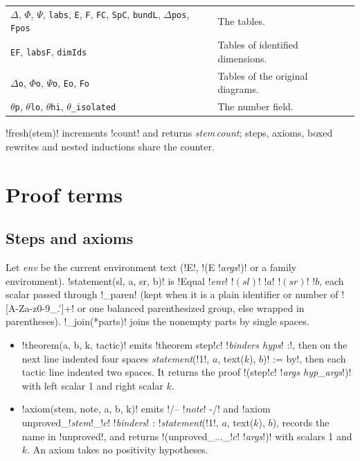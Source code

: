 {\begin{xltabular}{\linewidth}{@{}p{4.1cm}X@{}}
\texttt{$\Delta$}, \texttt{$\Phi$}, \texttt{$\Psi$}, \texttt{labs}, \texttt{E}, \texttt{F}, \texttt{FC}, \texttt{SpC},
  \texttt{bundL}, \texttt{$\Delta$pos}, \texttt{Fpos} & The tables. \\
\texttt{EF}, \texttt{labsF}, \texttt{dimIds} & Tables of identified dimensions. \\
\texttt{$\Delta$o}, \texttt{$\Phi$o}, \texttt{$\Psi$o}, \texttt{Eo}, \texttt{Fo} & Tables of the original diagrams. \\
\texttt{$\theta$p}, \texttt{$\theta$lo}, \texttt{$\theta$hi}, \texttt{$\theta$\_\allowbreak{}isolated} & The number field. \\
\bottomrule
\end{xltabular}

\py!fresh(stem)! increments \py!count! and returns \textit{stem}\,\textit{count}; steps, axioms,
boxed rewrites and nested inductions share the counter.

\section{Proof terms}\label{sec:lean-export-net-proofs}

\subsection{Steps and axioms}\label{sec:lean-export-net-steps}

Let \textit{env} be the current environment text (\code!E!, \code!(E !\textit{args}\code!)! or a
family environment). \py!statement(sl, a, sr, b)! is
\code!Equal !\textit{env}\code! !$(sl)$\code! !$a$\code! !$(sr)$\code! !$b$, each scalar passed
through \py!_paren! (kept when it is a plain identifier or number of
\code![A-Za-z0-9_.']+! or one balanced parenthesized group, else wrapped in parentheses).
\py!_join(*parts)! joins the nonempty parts by single spaces.

\begin{itemize}
\item \py!theorem(a, b, k, tactic)! emits
  \code!theorem step!$c$\code! !\textit{binders hyps}\code! :!, then on the next line indented
  four spaces \textit{statement}(\code!1!, $a$, text($k$), $b$)\code! := by!, then each tactic
  line indented two spaces. It returns the proof
  \code!(step!$c$\code! !\textit{args hyp\_args}\code!)! with left scalar 1 and right scalar $k$.
\item \py!axiom(stem, note, a, b, k)! emits \code!/-- !\textit{note}\code! -/! and
  \code!axiom unproved_!\textit{stem}\code!_!$c$\code! !\textit{binders}\code! : !\textit{statement}(\code!1!, $a$, text($k$), $b$),
  records the name in \py!unproved!, and returns \code!(unproved_..._!$c$\code! !\textit{args}\code!)!
  with scalars 1 and $k$. An axiom takes no positivity hypotheses.
\end{itemize}

}
